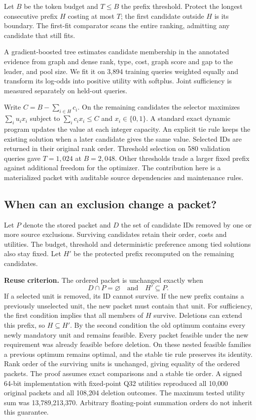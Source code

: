 \documentclass[conference]{IEEEtran}
\begin{document}
Let $B$ be the token budget and $T\leq B$ the prefix threshold. Protect the longest consecutive prefix $H$ costing at most $T$; the first candidate outside $H$ is its boundary. The first-fit comparator scans the entire ranking, admitting any candidate that still fits.

A gradient-boosted tree estimates candidate membership in the annotated evidence from graph and dense rank, type, cost, graph score and gap to the leader, and pool size. We fit it on 3,894 training queries weighted equally and transform its log-odds into positive utility with softplus. Joint sufficiency is measured separately on held-out queries.

Write $C=B-\sum_{i\in H} c_i$. On the remaining candidates the selector maximizes $\sum_i u_i x_i$ subject to $\sum_i c_i x_i\leq C$ and $x_i\in\{0,1\}$. A standard exact dynamic program updates the value at each integer capacity. An explicit tie rule keeps the existing solution when a later candidate gives the same value. Selected IDs are returned in their original rank order. Threshold selection on 580 validation queries gave $T=1,024$ at $B=2,048$. Other thresholds trade a larger fixed prefix against additional freedom for the optimizer. The contribution here is a materialized packet with auditable source dependencies and maintenance rules.

\subsection{When can an exclusion change a packet?}
Let $P$ denote the stored packet and $D$ the set of candidate IDs removed by one or more source exclusions. Surviving candidates retain their order, costs and utilities. The budget, threshold and deterministic preference among tied solutions also stay fixed. Let $H'$ be the protected prefix recomputed on the remaining candidates.

\textbf{Reuse criterion.} The ordered packet is unchanged exactly when
\[
           D\cap P=\varnothing \quad\text{and}\quad H'\subseteq P.
\]
If a selected unit is removed, its ID cannot survive. If the new prefix contains a previously unselected unit, the new packet must contain that unit. For sufficiency, the first condition implies that all members of $H$ survive. Deletions can extend this prefix, so $H\subseteq H'$. By the second condition the old optimum contains every newly mandatory unit and remains feasible. Every packet feasible under the new requirement was already feasible before deletion. On these nested feasible families a previous optimum remains optimal, and the stable tie rule preserves its identity. Rank order of the surviving units is unchanged, giving equality of the ordered packets. The proof assumes exact comparisons and a stable tie order. A signed 64-bit implementation with fixed-point Q32 utilities reproduced all 10,000 original packets and all 108,204 deletion outcomes. The maximum tested utility sum was 13,789,213,370. Arbitrary floating-point summation orders do not inherit this guarantee.
\end{document}
